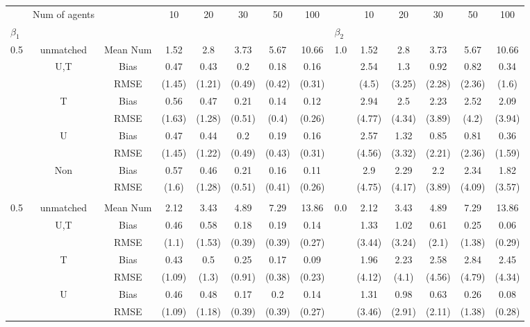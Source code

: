 \begin{tabular}{@{\extracolsep{5pt}}lc|cccccc|lccccc}
\toprule 
 & Num of agents &  & 10 & 20 & 30 & 50 & 100 &  & 10 & 20 & 30 & 50 & 100 \\
$\beta_1$ &  &  &  &  &  &  &  & $\beta_2$ &  &  &  &  &  \\
\midrule 
0.5 & unmatched & Mean Num & 1.52 & 2.8 & 3.73 & 5.67 & 10.66 & 1.0 & 1.52 & 2.8 & 3.73 & 5.67 & 10.66 \\
 & U,T & Bias & 0.47 & 0.43 & 0.2 & 0.18 & 0.16 &  & 2.54 & 1.3 & 0.92 & 0.82 & 0.34 \\
 &  & RMSE & (1.45) & (1.21) & (0.49) & (0.42) & (0.31) &  & (4.5) & (3.25) & (2.28) & (2.36) & (1.6) \\
 & T & Bias & 0.56 & 0.47 & 0.21 & 0.14 & 0.12 &  & 2.94 & 2.5 & 2.23 & 2.52 & 2.09 \\
 &  & RMSE & (1.63) & (1.28) & (0.51) & (0.4) & (0.26) &  & (4.77) & (4.34) & (3.89) & (4.2) & (3.94) \\
 & U & Bias & 0.47 & 0.44 & 0.2 & 0.19 & 0.16 &  & 2.57 & 1.32 & 0.85 & 0.81 & 0.36 \\
 &  & RMSE & (1.45) & (1.22) & (0.49) & (0.43) & (0.31) &  & (4.56) & (3.32) & (2.21) & (2.36) & (1.59) \\
 & Non & Bias & 0.57 & 0.46 & 0.21 & 0.16 & 0.11 &  & 2.9 & 2.29 & 2.2 & 2.34 & 1.82 \\
 &  & RMSE & (1.6) & (1.28) & (0.51) & (0.41) & (0.26) &  & (4.75) & (4.17) & (3.89) & (4.09) & (3.57) \\
 &  &  &  &  &  &  &  &  &  &  &  &  &  \\
0.5 & unmatched & Mean Num & 2.12 & 3.43 & 4.89 & 7.29 & 13.86 & 0.0 & 2.12 & 3.43 & 4.89 & 7.29 & 13.86 \\
 & U,T & Bias & 0.46 & 0.58 & 0.18 & 0.19 & 0.14 &  & 1.33 & 1.02 & 0.61 & 0.25 & 0.06 \\
 &  & RMSE & (1.1) & (1.53) & (0.39) & (0.39) & (0.27) &  & (3.44) & (3.24) & (2.1) & (1.38) & (0.29) \\
 & T & Bias & 0.43 & 0.5 & 0.25 & 0.17 & 0.09 &  & 1.96 & 2.23 & 2.58 & 2.84 & 2.45 \\
 &  & RMSE & (1.09) & (1.3) & (0.91) & (0.38) & (0.23) &  & (4.12) & (4.1) & (4.56) & (4.79) & (4.34) \\
 & U & Bias & 0.46 & 0.48 & 0.17 & 0.2 & 0.14 &  & 1.31 & 0.98 & 0.63 & 0.26 & 0.08 \\
 &  & RMSE & (1.09) & (1.18) & (0.39) & (0.39) & (0.27) &  & (3.46) & (2.91) & (2.11) & (1.38) & (0.28) \\

\end{tabular}
